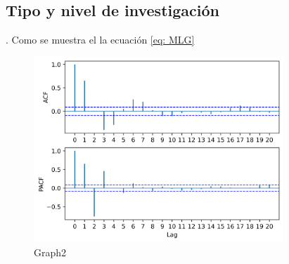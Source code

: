 \documentclass[12pt,a4paper]{article} %
\begin{document}
		\subsection{Tipo y nivel de investigación}
			\lipsum[1]. Como se muestra el la ecuación \textcolor{blue}{\eqref{eq: MLG}}
			\begin{figure}[ht]
				\centering
				\includegraphics[height=7cm]{Graph2.png}
				\caption{Graph2}
				\label{fig: Graph2}
			\end{figure}
\end{document}

